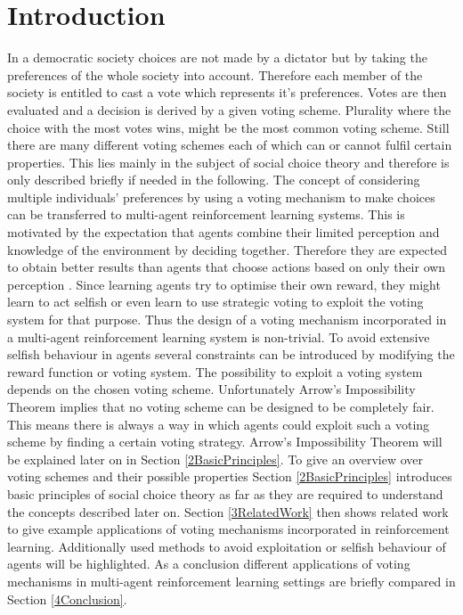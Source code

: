 \documentclass[conference]{IEEEtran}
\begin{document}
\section{Introduction}
In a democratic society choices are not made by a dictator but by taking the preferences of the whole society into account. Therefore each member of the society is entitled to cast a vote which represents it's preferences. Votes are then evaluated and a decision is derived by a given voting scheme. Plurality where the choice with the most votes wins, might be the most common voting scheme. Still there are many different voting schemes each of which can or cannot fulfil certain properties. This lies mainly in the subject of social choice theory and therefore is only described briefly if needed in the following.
\newline
The concept of considering multiple individuals' preferences by using a voting mechanism to make choices can be transferred to multi-agent reinforcement learning systems. This is motivated by the expectation that agents combine their limited perception and knowledge of the environment by deciding together. Therefore they are expected to obtain better results than agents that choose actions based on only their own perception \cite{partalas2008hybrid}.
\newline
Since learning agents try to optimise their own reward, they might learn to act selfish\cite{carr2008peer} or even learn to use strategic voting to exploit the voting system\cite{pitt2006voting} for that purpose.
Thus the design of a voting mechanism incorporated in a multi-agent reinforcement learning system is non-trivial.
To avoid extensive selfish behaviour in agents several constraints can be introduced by modifying the reward function or voting system.
The possibility to exploit a voting system depends on the chosen voting scheme.
Unfortunately Arrow's Impossibility Theorem implies that no voting scheme can be designed to be completely fair. This means there is always a way in which agents could exploit such a voting scheme by finding a certain voting strategy. Arrow's Impossibility Theorem will be explained later on in Section \ref{2BasicPrinciples}.
\newline
To give an overview over voting schemes and their possible properties Section \ref{2BasicPrinciples} introduces basic principles of social choice theory as far as they are required to understand the concepts described later on.
Section \ref{3RelatedWork} then shows related work to give example  applications of voting mechanisms incorporated in reinforcement learning.
Additionally used methods to avoid exploitation or selfish behaviour of agents will be highlighted.
As a conclusion different applications of voting mechanisms in multi-agent reinforcement learning settings are briefly compared in Section \ref{4Conclusion}.
\end{document}
